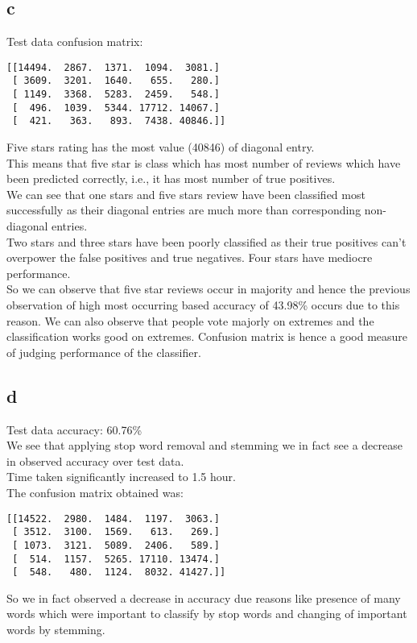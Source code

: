 \documentclass[10pt]{article}
\begin{document}
\subsection{c}
Test data confusion matrix: \\
\begin{lstlisting}
[[14494.  2867.  1371.  1094.  3081.]
 [ 3609.  3201.  1640.   655.   280.]
 [ 1149.  3368.  5283.  2459.   548.]
 [  496.  1039.  5344. 17712. 14067.]
 [  421.   363.   893.  7438. 40846.]]
\end{lstlisting}
Five stars rating has the most value (40846) of diagonal entry.\\
This means that five star is class which has most number of reviews which have been predicted correctly, i.e., it has most number of true positives.\\
We can see that one stars and five stars review have been classified most successfully as their diagonal entries are much more than corresponding non-diagonal entries.\\
Two stars and three stars have been poorly classified as their true positives can't overpower the false positives and true negatives. Four stars have mediocre performance.\\
So we can observe that five star reviews occur in majority and hence the previous observation of high most occurring based accuracy of 43.98\% occurs due to this reason. We can also observe that people vote majorly on extremes and the classification works good on extremes. Confusion matrix is hence a good measure of judging performance of the classifier.\\
\subsection{d}
Test data accuracy: 60.76\%\\
We see that applying stop word removal and stemming we in fact see a decrease in observed accuracy over test data.\\
Time taken significantly increased to 1.5 hour.\\
The confusion matrix obtained was:\\
\begin{lstlisting}
[[14522.  2980.  1484.  1197.  3063.]
 [ 3512.  3100.  1569.   613.   269.]
 [ 1073.  3121.  5089.  2406.   589.]
 [  514.  1157.  5265. 17110. 13474.]
 [  548.   480.  1124.  8032. 41427.]]
\end{lstlisting}
So we in fact observed a decrease in accuracy due reasons like presence of many words which were important to classify by stop words and changing of important words by stemming.\\
\end{document}
